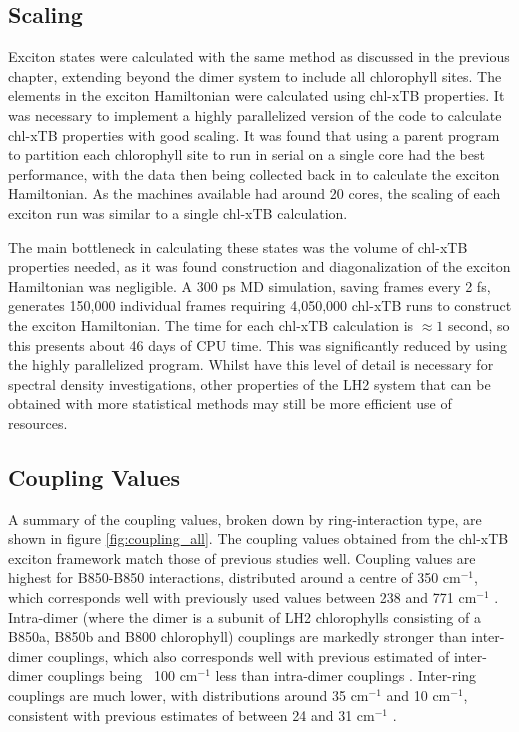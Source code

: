 \subsection{Scaling}
\label{subsec:specdens_scaling}

Exciton states were calculated with the same method as discussed in the previous 
chapter, extending beyond the dimer system to include all chlorophyll sites. The
elements in the exciton Hamiltonian were calculated using chl-xTB properties. It
was necessary to implement a highly parallelized version of the code to calculate 
chl-xTB properties with good scaling. It was found that using a parent program to 
partition each chlorophyll site to run in serial on a single core had the best performance,
with the data then being collected back in to calculate the exciton Hamiltonian.
As the machines available had around 20 cores, the scaling of each exciton run was
similar to a single chl-xTB calculation.

The main bottleneck in calculating these states was the volume of chl-xTB properties
needed, as it was found construction and diagonalization of the exciton Hamiltonian
was negligible. A 300 ps MD simulation, saving frames every 2 fs, generates 150,000
individual frames requiring 4,050,000 chl-xTB runs to construct the exciton Hamiltonian.
The time for each chl-xTB calculation is $\approx 1$ second, so this presents about
46 days of CPU time. This was significantly reduced by using the highly parallelized
program. Whilst have this level of detail is necessary for spectral density investigations,
other properties of the LH2 system that can be obtained with more statistical methods
may still be more efficient use of resources.

\subsection{Coupling Values}
\label{subsec:coupling_values}

A summary of the coupling values, broken down by ring-interaction type, are shown
in figure \ref{fig:coupling_all}. 
The coupling values obtained from the chl-xTB exciton framework match those of previous
studies well. Coupling values are highest for B850-B850 interactions, distributed
around a centre of 350 $\text{cm}^{-1}$, which corresponds well with previously 
used values between 238 and 771 $\text{cm}^{-1}$ \cite{Cogdell2006}. Intra-dimer
(where the dimer is a subunit of LH2 chlorophylls consisting of a B850a, B850b and
B800 chlorophyll) couplings are markedly stronger than inter-dimer couplings, which
also corresponds well with previous estimated of inter-dimer couplings being ~100 
$\text{cm}^{-1}$ less than intra-dimer couplings \cite{Koolhaas1997, Jimenez1996, Chachisvilis1997, Scholes2000}. 
Inter-ring couplings are much lower, with distributions around 35 $\text{cm}^{-1}$
and 10 $\text{cm}^{-1}$, consistent with previous estimates of between 24 and 31 
$\text{cm}^{-1}$ \cite{Krueger1998}.

